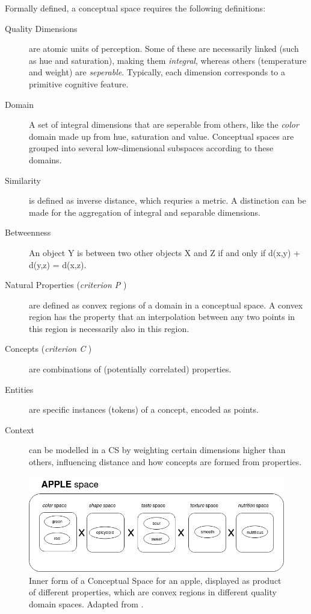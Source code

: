 Formally defined, a conceptual space requires the following definitions:
\begin{description}
    \item[Quality Dimensions] are atomic units of perception. Some of these are necessarily linked (such as hue and saturation), making them \textit{integral}, whereas others (\eg temperature and weight) are \textit{seperable}. Typically, each dimension corresponds to a primitive cognitive feature.
    \item[Domain] A set of integral dimensions that are seperable from others, like the \textit{color} domain made up from hue, saturation and value. Conceptual spaces are grouped into several low-dimensional subspaces according to these domains.
    \item[Similarity] is defined as inverse distance, which requries a metric. A distinction can be made for the aggregation of integral and separable dimensions. 
    \item[Betweenness] An object Y is between two other objects X and Z if and only if d(x,y) + d(y,z) = d(x,z).
    \item[Natural Properties (\textit{criterion P} \cite{Gardenfors2000a})] are defined as convex regions of a domain in a conceptual space. A convex region has the property that an interpolation between any two points in this region is necessarily also in this region. 
    \item[Concepts (\textit{criterion C} \cite{Gardenfors2000a})] are combinations of (potentially correlated) properties.  \cite[8]{Gardenfors2004}
    \item[Entities] are specific instances (tokens) of a concept, encoded as points. 
    \item[Context] can be modelled in a CS by weighting certain dimensions higher than others, influencing distance and how concepts are formed from properties.
\end{description}


\begin{figure}[H]
	\centering
	\includegraphics[width=\textwidth]{graphics/stolenfigures/apple_space.png}
	\caption[Inner form of a Conceptual Space for an apple]{
		Inner form of a Conceptual Space for an apple, displayed as product of different properties, which are convex regions in different quality domain spaces. Adapted from \cite{Fiorini2013}.
	}
    \label{fig:apple_cs}
\end{figure}

